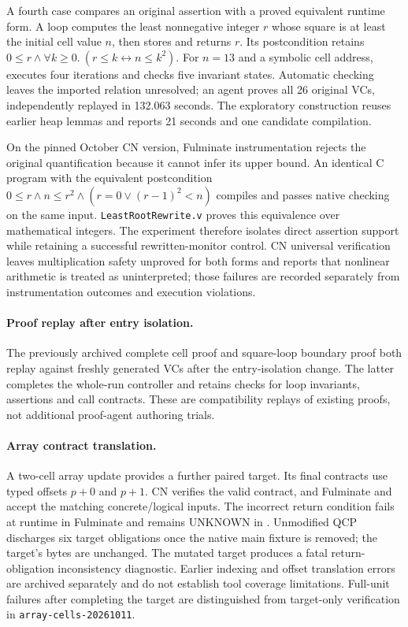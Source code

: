 A fourth case compares an original assertion with a proved equivalent runtime
form. A loop computes the least nonnegative integer $r$ whose square is at
least the initial cell value $n$, then stores and returns $r$. Its postcondition
retains $0\le r\land\forall k\ge0.\ (r\le k\leftrightarrow n\le k^2)$.
For $n=13$ and a symbolic cell address, \tespec{} executes four iterations and
checks five invariant states. Automatic checking leaves the imported relation
unresolved; an agent proves all 26 original VCs, independently replayed in
132.063 seconds. The exploratory construction reuses earlier heap lemmas and
reports 21 seconds and one candidate compilation.

On the pinned October CN version, Fulminate instrumentation rejects the original
quantification because it cannot infer its upper bound. An identical C program
with the equivalent postcondition
$0\le r\land n\le r^2\land(r=0\lor(r-1)^2<n)$ compiles and passes native
checking on the same input. \texttt{LeastRootRewrite.v} proves this equivalence
over mathematical integers. The experiment therefore isolates direct assertion
support while retaining a successful rewritten-monitor control. CN universal
verification leaves multiplication safety unproved for both forms and reports
that nonlinear arithmetic is treated as uninterpreted; those failures are
recorded separately from instrumentation outcomes and execution violations.

\paragraph{Proof replay after entry isolation.}
The previously archived complete cell proof and square-loop boundary proof
both replay against freshly generated VCs after the entry-isolation change.
The latter completes the whole-run controller and retains checks for loop
invariants, assertions and call contracts. These are compatibility replays of
existing proofs, not additional proof-agent authoring trials.

\paragraph{Array contract translation.}
A two-cell array update provides a further paired target. Its final contracts
use typed offsets $p+0$ and $p+1$. CN verifies the valid contract, and Fulminate
and \tespec{} accept the matching concrete/logical inputs. The incorrect return
condition fails at runtime in Fulminate and remains UNKNOWN in \tespec{}.
Unmodified QCP discharges six target obligations once the native main fixture
is removed; the target's bytes are unchanged. The mutated target produces a
fatal return-obligation inconsistency diagnostic. Earlier indexing and offset
translation errors are archived separately and do not establish tool coverage
limitations. Full-unit failures after completing the target are distinguished
from target-only verification in \texttt{array-cells-20261011}.


